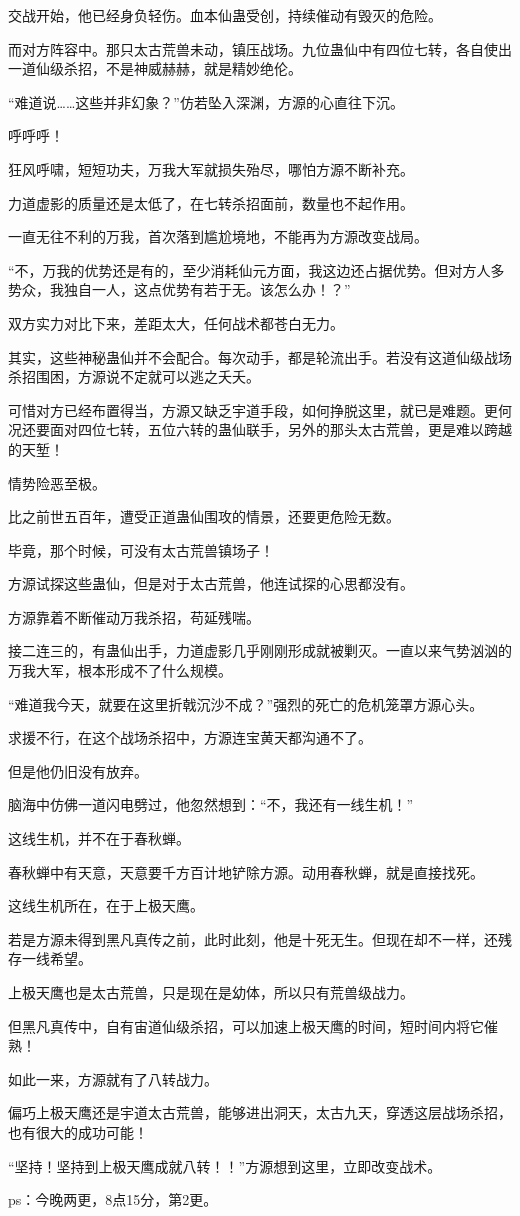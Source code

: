 \begin{this_body}
交战开始，他已经身负轻伤。血本仙蛊受创，持续催动有毁灭的危险。

而对方阵容中。那只太古荒兽未动，镇压战场。九位蛊仙中有四位七转，各自使出一道仙级杀招，不是神威赫赫，就是精妙绝伦。

“难道说……这些并非幻象？”仿若坠入深渊，方源的心直往下沉。

呼呼呼！

狂风呼啸，短短功夫，万我大军就损失殆尽，哪怕方源不断补充。

力道虚影的质量还是太低了，在七转杀招面前，数量也不起作用。

一直无往不利的万我，首次落到尴尬境地，不能再为方源改变战局。

“不，万我的优势还是有的，至少消耗仙元方面，我这边还占据优势。但对方人多势众，我独自一人，这点优势有若于无。该怎么办！？”

双方实力对比下来，差距太大，任何战术都苍白无力。

其实，这些神秘蛊仙并不会配合。每次动手，都是轮流出手。若没有这道仙级战场杀招围困，方源说不定就可以逃之夭夭。

可惜对方已经布置得当，方源又缺乏宇道手段，如何挣脱这里，就已是难题。更何况还要面对四位七转，五位六转的蛊仙联手，另外的那头太古荒兽，更是难以跨越的天堑！

情势险恶至极。

比之前世五百年，遭受正道蛊仙围攻的情景，还要更危险无数。

毕竟，那个时候，可没有太古荒兽镇场子！

方源试探这些蛊仙，但是对于太古荒兽，他连试探的心思都没有。

方源靠着不断催动万我杀招，苟延残喘。

接二连三的，有蛊仙出手，力道虚影几乎刚刚形成就被剿灭。一直以来气势汹汹的万我大军，根本形成不了什么规模。

“难道我今天，就要在这里折戟沉沙不成？”强烈的死亡的危机笼罩方源心头。

求援不行，在这个战场杀招中，方源连宝黄天都沟通不了。

但是他仍旧没有放弃。

脑海中仿佛一道闪电劈过，他忽然想到：“不，我还有一线生机！”

这线生机，并不在于春秋蝉。

春秋蝉中有天意，天意要千方百计地铲除方源。动用春秋蝉，就是直接找死。

这线生机所在，在于上极天鹰。

若是方源未得到黑凡真传之前，此时此刻，他是十死无生。但现在却不一样，还残存一线希望。

上极天鹰也是太古荒兽，只是现在是幼体，所以只有荒兽级战力。

但黑凡真传中，自有宙道仙级杀招，可以加速上极天鹰的时间，短时间内将它催熟！

如此一来，方源就有了八转战力。

偏巧上极天鹰还是宇道太古荒兽，能够进出洞天，太古九天，穿透这层战场杀招，也有很大的成功可能！

“坚持！坚持到上极天鹰成就八转！！”方源想到这里，立即改变战术。

ps：今晚两更，8点15分，第2更。

\end{this_body}

